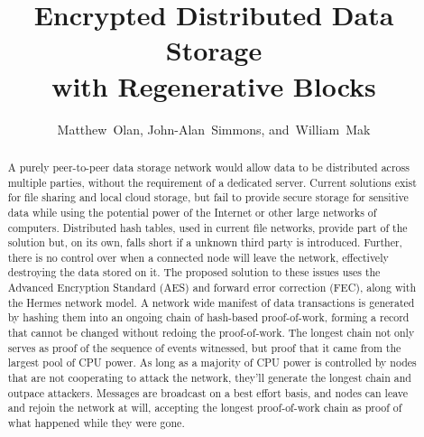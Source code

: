 \documentclass[journal]{IEEEtran}
\begin{document}
\title{Encrypted Distributed Data Storage\\with Regenerative Blocks}

\author{
        Matthew~Olan, %
        John-Alan~Simmons,
        and~William~Mak
}


\maketitle

\begin{abstract} %
A purely peer-to-peer data storage network would allow data to be distributed across multiple parties, without the requirement of a dedicated server. Current solutions exist for file sharing and local cloud storage, but fail to provide secure storage for sensitive data while using the potential power of the Internet or other large networks of computers. Distributed hash tables, used in current file networks, provide part of the solution but, on its own, falls short if a unknown third party is introduced. Further, there is no control over when a connected node will leave the network, effectively destroying the data stored on it. The proposed solution to these issues uses the Advanced Encryption Standard (AES) and forward error correction (FEC), along with the Hermes network model. A network wide manifest of data transactions is generated by hashing them into an ongoing chain of hash-based proof-of-work, forming a record that cannot be changed without redoing the proof-of-work. The longest chain not only serves as proof of the sequence of events witnessed, but proof that it came from the largest pool of CPU power. As long as a majority of CPU power is controlled by nodes that are not cooperating to attack the network, they'll generate the longest chain and outpace attackers. Messages are broadcast on a best effort basis, and nodes can leave and rejoin the network at will, accepting the longest proof-of-work chain as proof of what happened while they were gone.
\end{abstract}

\IEEEpeerreviewmaketitle
\end{document}
